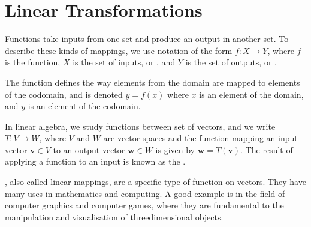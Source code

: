 \documentclass[letterpaper,10pt,english]{jupyterBook}
\begin{document}
\sphinxstepscope

\ignorespaces 

\chapter{Linear Transformations}
\label{\detokenize{_pages/6.0_Linear_transformations:linear-transformations}}\label{\detokenize{_pages/6.0_Linear_transformations:index-0}}\label{\detokenize{_pages/6.0_Linear_transformations:linear-transformations-chapter}}\label{\detokenize{_pages/6.0_Linear_transformations::doc}}
\sphinxAtStartPar
Functions take inputs from one set and produce an output in another set. To describe these kinds of mappings, we use notation of the form \(f: X \to Y\), where \(f\) is the function, \(X\) is the set of inputs, or , and \(Y\) is the set of outputs, or .

\sphinxAtStartPar
The function defines the way elements from the domain are mapped to elements of the codomain, and is denoted \(y = f(x)\) where \(x\) is an element of the domain, and \(y\) is an element of the co\sphinxhyphen{}domain.

\sphinxAtStartPar
In linear algebra, we study functions between set of vectors, and we write \(T: V \to W\), where \(V\) and \(W\) are vector spaces and the function mapping an input vector \(\mathbf{v} \in V\) to an output vector \(\mathbf{w} \in W\) is given by \(\mathbf{w} = T(\mathbf{v})\). The result of applying a function to an input is known as the .

\sphinxAtStartPar
{}, also called linear mappings, are a specific type of function on vectors. They have many uses in mathematics and computing. A good example is in the field of computer graphics and computer games, where they are fundamental to the manipulation and visualisation of three\sphinxhyphen{}dimensional objects.
\end{document}
